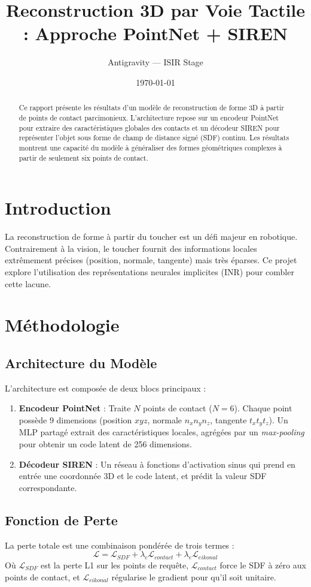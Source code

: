 \documentclass[11pt,a4paper]{article}
\title{Reconstruction 3D par Voie Tactile : Approche PointNet + SIREN}
\author{Antigravity — ISIR Stage}
\date{\today}
\begin{document}
\maketitle

\begin{abstract}
Ce rapport présente les résultats d'un modèle de reconstruction de forme 3D à partir de points de contact parcimonieux. L'architecture repose sur un encodeur PointNet pour extraire des caractéristiques globales des contacts et un décodeur SIREN pour représenter l'objet sous forme de champ de distance signé (SDF) continu. Les résultats montrent une capacité du modèle à généraliser des formes géométriques complexes à partir de seulement six points de contact.
\end{abstract}

\section{Introduction}
La reconstruction de forme à partir du toucher est un défi majeur en robotique. Contrairement à la vision, le toucher fournit des informations locales extrêmement précises (position, normale, tangente) mais très éparses. Ce projet explore l'utilisation des représentations neurales implicites (INR) pour combler cette lacune.

\section{Méthodologie}

\subsection{Architecture du Modèle}
L'architecture est composée de deux blocs principaux :
\begin{enumerate}
    \item \textbf{Encodeur PointNet} : Traite $N$ points de contact ($N=6$). Chaque point possède 9 dimensions (position $xyz$, normale $n_x n_y n_z$, tangente $t_x t_y t_z$). Un MLP partagé extrait des caractéristiques locales, agrégées par un \textit{max-pooling} pour obtenir un code latent de 256 dimensions.
    \item \textbf{Décodeur SIREN} : Un réseau à fonctions d'activation sinus qui prend en entrée une coordonnée 3D et le code latent, et prédit la valeur SDF correspondante.
\end{enumerate}

\subsection{Fonction de Perte}
La perte totale est une combinaison pondérée de trois termes :
\begin{equation}
    \mathcal{L} = \mathcal{L}_{SDF} + \lambda_{c} \mathcal{L}_{contact} + \lambda_{e} \mathcal{L}_{eikonal}
\end{equation}
Où $\mathcal{L}_{SDF}$ est la perte L1 sur les points de requête, $\mathcal{L}_{contact}$ force le SDF à zéro aux points de contact, et $\mathcal{L}_{eikonal}$ régularise le gradient pour qu'il soit unitaire.
\end{document}
